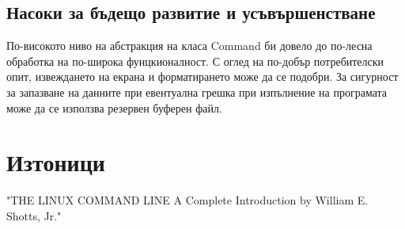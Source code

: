 \documentclass[a4paper,12pt]{article}
\begin{document}
\subsection{Насоки за бъдещо развитие и усъвършенстване}
По-високото ниво на абстракция на класа Command би довело до по-лесна обработка на по-широка фунцкионалност.
С оглед на по-добър потребителски опит, извеждането на екрана и форматирането може да се подобри.
За сигурност за запазване на данните при евентуална грешка при изпълнение на програмата може да се използва резервен буферен файл.

\section{Изтоници}
"THE LINUX COMMAND LINE A Complete Introduction by William E. Shotts, Jr."
\end{document}
